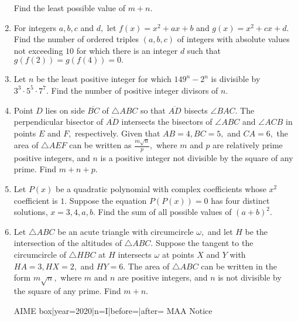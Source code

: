 \documentclass{article}
\begin{document}
\begin{enumerate}[label=\arabic*., itemsep=0.5em]
Find the least possible value of $m+n.$\par \vspace{0.5em}\item For integers $a,b,c$ and $d,$ let $f(x)=x^2+ax+b$ and $g(x)=x^2+cx+d.$ Find the number of ordered triples $(a,b,c)$ of integers with absolute values not exceeding $10$ for which there is an integer $d$ such that $g(f(2))=g(f(4))=0.$\par \vspace{0.5em}\item Let $n$ be the least positive integer for which $149^n-2^n$ is divisible by $3^3\cdot5^5\cdot7^7.$ Find the number of positive integer divisors of $n.$\par \vspace{0.5em}\item Point $D$ lies on side $\overline{BC}$ of $\triangle ABC$ so that $\overline{AD}$ bisects $\angle BAC.$ The perpendicular bisector of $\overline{AD}$ intersects the bisectors of $\angle ABC$ and $\angle ACB$ in points $E$ and $F,$ respectively. Given that $AB=4,BC=5,$ and $CA=6,$ the area of $\triangle AEF$ can be written as $\tfrac{m\sqrt{n}}p,$ where $m$ and $p$ are relatively prime positive integers, and $n$ is a positive integer not divisible by the square of any prime. Find $m+n+p$.\par \vspace{0.5em}\item Let $P(x)$ be a quadratic polynomial with complex coefficients whose $x^2$ coefficient is $1.$ Suppose the equation $P(P(x))=0$ has four distinct solutions, $x=3,4,a,b.$ Find the sum of all possible values of $(a+b)^2.$\par \vspace{0.5em}\item Let $\triangle ABC$ be an acute triangle with circumcircle $\omega,$ and let $H$ be the intersection of the altitudes of $\triangle ABC.$ Suppose the tangent to the circumcircle of $\triangle HBC$ at $H$ intersects $\omega$ at points $X$ and $Y$ with $HA=3,HX=2,$ and $HY=6.$ The area of $\triangle ABC$ can be written in the form $m\sqrt{n},$ where $m$ and $n$ are positive integers, and $n$ is not divisible by the square of any prime. Find $m+n.$




{{AIME box|year=2020|n=I|before=|after=}}
{{MAA Notice}}\par \vspace{0.5em}\end{enumerate}
\end{document}
